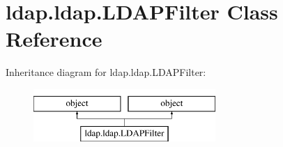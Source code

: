 \hypertarget{classldap_1_1ldap_1_1LDAPFilter}{\section{ldap.\-ldap.\-L\-D\-A\-P\-Filter Class Reference}
\label{classldap_1_1ldap_1_1LDAPFilter}
}
Inheritance diagram for ldap.\-ldap.\-L\-D\-A\-P\-Filter\-:\begin{figure}[H]
\begin{center}
\leavevmode
\includegraphics[height=2.000000cm]{classldap_1_1ldap_1_1LDAPFilter}
\end{center}
\end{figure}
